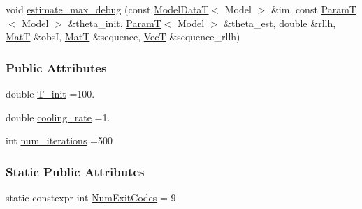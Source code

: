 \begin{DoxyCompactItemize}
\item 
void \hyperlink{classmappel_1_1Estimator_a4a581372a320f1c13eeffacf6309911b}{estimate\+\_\+max\+\_\+debug} (const \hyperlink{namespacemappel_a97f050df953605381ae9c901c3b125f1}{Model\+DataT}$<$ Model $>$ \&im, const \hyperlink{namespacemappel_a667925cb0d6c0e49f2f035cc5a9a6857}{ParamT}$<$ Model $>$ \&theta\+\_\+init, \hyperlink{namespacemappel_a667925cb0d6c0e49f2f035cc5a9a6857}{ParamT}$<$ Model $>$ \&theta\+\_\+est, double \&rllh, \hyperlink{namespacemappel_a7091ab87c528041f7e2027195fad8915}{MatT} \&obsI, \hyperlink{namespacemappel_a7091ab87c528041f7e2027195fad8915}{MatT} \&sequence, \hyperlink{namespacemappel_a2225ad69f358daa3f4f99282a35b9a3a}{VecT} \&sequence\+\_\+rllh)
\end{DoxyCompactItemize}
\subsubsection*{Public Attributes}
\begin{DoxyCompactItemize}
\item 
double \hyperlink{classmappel_1_1SimulatedAnnealingMaximizer_a5a697acb3663ef6aad85157cce00080e}{T\+\_\+init} =100.
\item 
double \hyperlink{classmappel_1_1SimulatedAnnealingMaximizer_af67fa796254c7b027de1a44b5d33afcb}{cooling\+\_\+rate} =1.
\item 
int \hyperlink{classmappel_1_1SimulatedAnnealingMaximizer_aa116767bae33acaa107913067013e26d}{num\+\_\+iterations} =500
\end{DoxyCompactItemize}
\subsubsection*{Static Public Attributes}
\begin{DoxyCompactItemize}
\item 
static constexpr int \hyperlink{classmappel_1_1Estimator_afcec036c4d78c12d427e0a733a00a48e}{Num\+Exit\+Codes} = 9
\end{DoxyCompactItemize}
